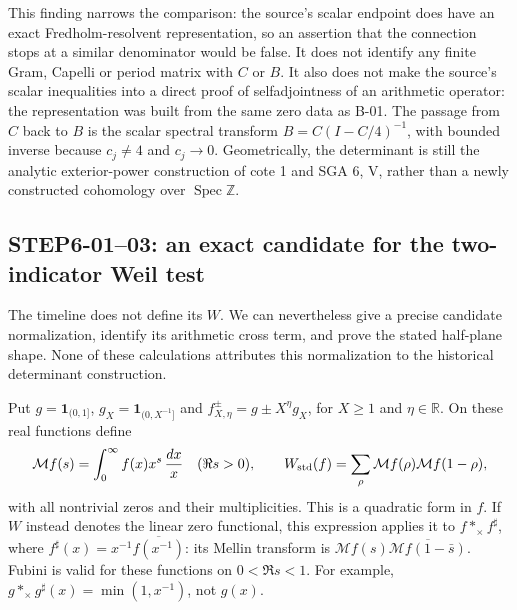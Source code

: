 \documentclass[11pt,a4paper]{article}
\newcommand{\M}{\mathcal M}
\newcommand{\R}{\mathbb R}
\newcommand{\Z}{\mathbb Z}
\newcommand{\fid}[1]{\textsf{#1}}
\begin{document}
This finding narrows the comparison: the source's scalar endpoint does have an exact Fredholm-resolvent representation, so an assertion that the connection stops at a similar denominator would be false. It does not identify any finite Gram, Capelli or period matrix with $C$ or $B$. It also does not make the source's scalar inequalities into a direct proof of selfadjointness of an arithmetic operator: the representation was built from the same zero data as \fid{B-01}. The passage from $C$ back to $B$ is the scalar spectral transform $B=C(I-C/4)^{-1}$, with bounded inverse because $c_j\ne4$ and $c_j\to0$. Geometrically, the determinant is still the analytic exterior-power construction of cote 1 and SGA 6, V, rather than a newly constructed cohomology over $\operatorname{Spec}\Z$.

\subsection{STEP6-01--03: an exact candidate for the two-indicator Weil test}
The timeline does not define its $W$. We can nevertheless give a precise candidate normalization, identify its arithmetic cross term, and prove the stated half-plane shape. None of these calculations attributes this normalization to the historical determinant construction.

Put $g=\mathbf1_{(0,1]}$, $g_X=\mathbf1_{(0,X^{-1}]}$ and $f^\pm_{X,\eta}=g\pm X^\eta g_X$, for $X\ge1$ and $\eta\in\R$. On these real functions define
\[
 \M f(s)=\int_0^\infty f(x)x^s\,\frac{dx}{x}\quad(\Re s>0),
 \qquad W_{\rm std}(f)=\sum_\rho\M f(\rho)\M f(1-\rho),
\]
with all nontrivial zeros and their multiplicities. This is a quadratic form in $f$. If $W$ instead denotes the linear zero functional, this expression applies it to $f*_\times f^\sharp$, where $f^\sharp(x)=x^{-1}\overline{f(x^{-1})}$: its Mellin transform is $\M f(s)\overline{\M f(1-\bar s)}$. Fubini is valid for these functions on $0<\Re s<1$. For example, $g*_\times g^\sharp(x)=\min(1,x^{-1})$, not $g(x)$.
\end{document}
